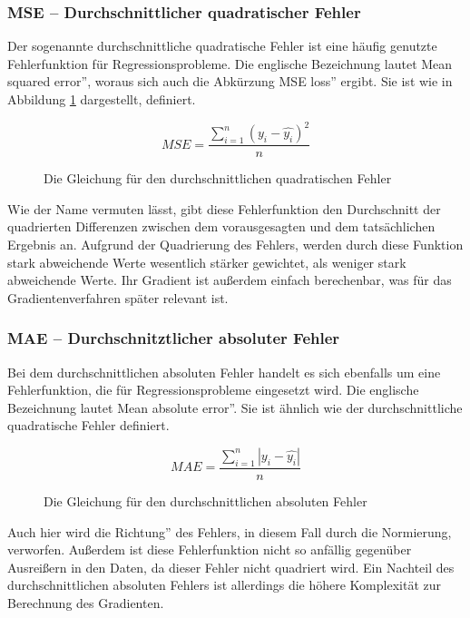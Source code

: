 \documentclass{article}
\begin{document}
\subsubsection{MSE -- Durchschnittlicher quadratischer Fehler}
Der sogenannte durchschnittliche quadratische Fehler ist eine häufig genutzte Fehlerfunktion für Regressionsprobleme. Die englische Bezeichnung lautet \glqq Mean squared error'', woraus sich auch die Abkürzung \glqq MSE loss'' ergibt. Sie ist wie in Abbildung \ref{MSE_equation} dargestellt, definiert.
\begin{figure}[h]
	\begin{equation*}
		MSE=\dfrac{\sum\limits_{i=1}^n(y_i-\hat{y_i})^2}{n}
	\end{equation*}
	\caption{Die Gleichung für den durchschnittlichen quadratischen Fehler}
	\label{MSE_equation}
\end{figure}
\newline
Wie der Name vermuten lässt, gibt diese Fehlerfunktion den Durchschnitt der quadrierten Differenzen zwischen dem vorausgesagten und dem tatsächlichen Ergebnis an. Aufgrund der Quadrierung des Fehlers, werden durch diese Funktion stark abweichende Werte wesentlich stärker gewichtet, als weniger stark abweichende Werte. Ihr Gradient ist außerdem einfach berechenbar, was für das Gradientenverfahren später relevant ist.\cite{3}
\subsubsection{MAE -- Durchschnitztlicher absoluter Fehler}
Bei dem durchschnittlichen absoluten Fehler handelt es sich ebenfalls um eine Fehlerfunktion, die für Regressionsprobleme eingesetzt wird. Die englische Bezeichnung lautet \glqq Mean absolute error''. Sie ist ähnlich wie der durchschnittliche quadratische Fehler definiert.
\begin{figure}[h]
	\begin{equation*}
	MAE=\dfrac{\sum\limits_{i=1}^n|y_i-\hat{y_i}|}{n}
	\end{equation*}
	\caption{Die Gleichung für den durchschnittlichen absoluten Fehler}
	\label{MAE_equation}
\end{figure}
\newline
Auch hier wird die \glqq Richtung'' des Fehlers, in diesem Fall durch die Normierung, verworfen. Außerdem ist diese Fehlerfunktion nicht so anfällig gegenüber Ausreißern in den Daten, da dieser Fehler nicht quadriert wird. Ein Nachteil des durchschnittlichen absoluten Fehlers ist allerdings die höhere Komplexität zur Berechnung des Gradienten.\cite{3}
\end{document}
